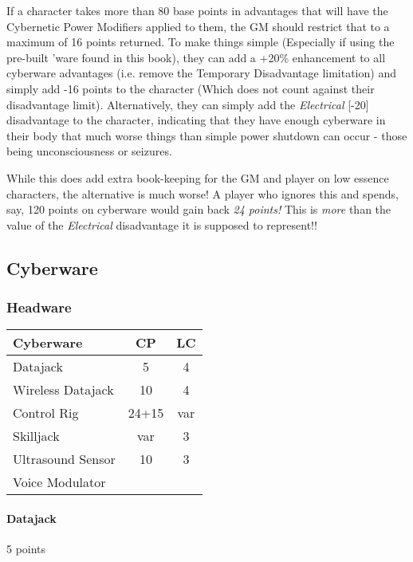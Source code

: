 \begin{multicols*}{3}
	If a character takes more than 80 base points in advantages that will have the Cybernetic Power Modifiers applied to them, the GM should restrict that to a maximum of 16 points returned. To make things simple (Especially if using the pre-built 'ware found in this book), they can add a +20\% enhancement to all cyberware advantages (i.e. remove the Temporary Disadvantage limitation) and simply add -16 points to the character (Which does not count against their disadvantage limit). Alternatively, they can simply add the \textit{Electrical} [-20] disadvantage to the character, indicating that they have enough cyberware in their body that much worse things than simple power shutdown can occur - those being unconsciousness or seizures.
	
	While this does add extra book-keeping for the GM and player on low essence characters, the alternative is much worse! A player who ignores this and spends, say, 120 points on cyberware would gain back \textit{24 points!} This is \textit{more} than the value of the \textit{Electrical} disadvantage it is supposed to represent!!
	
	\subsection{Cyberware}
	
	\subsubsection{Headware}
	
	\begin{center}
		\begin{tabularx}{0.32\textwidth}{|X|c|c|}
			\hline
			Cyberware & CP & LC\\
			\hline
			\hline
			Datajack & 5 & 4\\
			Wireless Datajack & 10 & 4\\
			Control Rig & 24+15 & var\\
			Skilljack & var & 3 \\
			Ultrasound Sensor & 10 & 3 \\
			Voice Modulator & & \\
			\hline
		\end{tabularx}
	\end{center}
	
	\paragraph{Datajack}
	\begin{flushright}
		5 points
	\end{flushright}
	

\end{multicols*}
